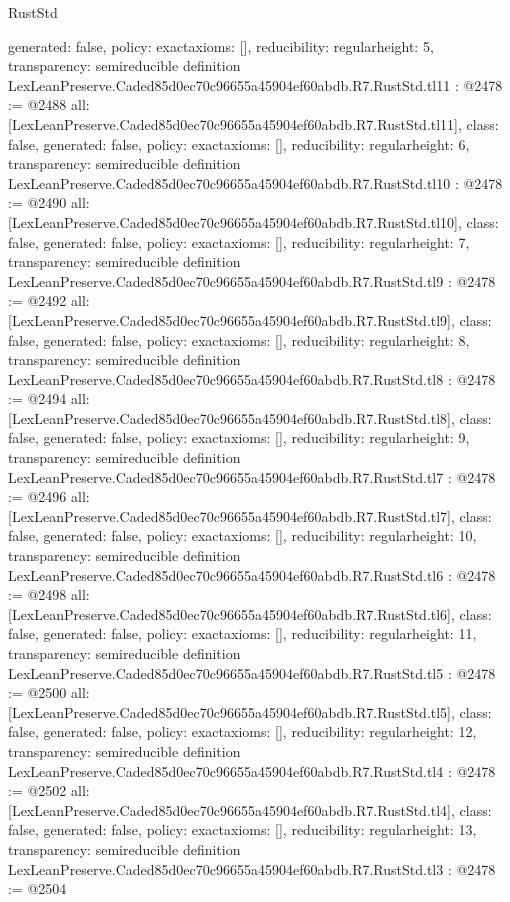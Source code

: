 \begin{lexlean}{RustStd}
\begin{coremodule}
{  generated: false,
  policy: exact{axioms: []},
  reducibility: regular{height: 5},
  transparency: semireducible
}
definition LexLeanPreserve.Caded85d0ec70c96655a45904ef60abdb.R7.RustStd.tl11 : @2478 := @2488 {
  all: [LexLeanPreserve.Caded85d0ec70c96655a45904ef60abdb.R7.RustStd.tl11],
  class: false,
  generated: false,
  policy: exact{axioms: []},
  reducibility: regular{height: 6},
  transparency: semireducible
}
definition LexLeanPreserve.Caded85d0ec70c96655a45904ef60abdb.R7.RustStd.tl10 : @2478 := @2490 {
  all: [LexLeanPreserve.Caded85d0ec70c96655a45904ef60abdb.R7.RustStd.tl10],
  class: false,
  generated: false,
  policy: exact{axioms: []},
  reducibility: regular{height: 7},
  transparency: semireducible
}
definition LexLeanPreserve.Caded85d0ec70c96655a45904ef60abdb.R7.RustStd.tl9 : @2478 := @2492 {
  all: [LexLeanPreserve.Caded85d0ec70c96655a45904ef60abdb.R7.RustStd.tl9],
  class: false,
  generated: false,
  policy: exact{axioms: []},
  reducibility: regular{height: 8},
  transparency: semireducible
}
definition LexLeanPreserve.Caded85d0ec70c96655a45904ef60abdb.R7.RustStd.tl8 : @2478 := @2494 {
  all: [LexLeanPreserve.Caded85d0ec70c96655a45904ef60abdb.R7.RustStd.tl8],
  class: false,
  generated: false,
  policy: exact{axioms: []},
  reducibility: regular{height: 9},
  transparency: semireducible
}
definition LexLeanPreserve.Caded85d0ec70c96655a45904ef60abdb.R7.RustStd.tl7 : @2478 := @2496 {
  all: [LexLeanPreserve.Caded85d0ec70c96655a45904ef60abdb.R7.RustStd.tl7],
  class: false,
  generated: false,
  policy: exact{axioms: []},
  reducibility: regular{height: 10},
  transparency: semireducible
}
definition LexLeanPreserve.Caded85d0ec70c96655a45904ef60abdb.R7.RustStd.tl6 : @2478 := @2498 {
  all: [LexLeanPreserve.Caded85d0ec70c96655a45904ef60abdb.R7.RustStd.tl6],
  class: false,
  generated: false,
  policy: exact{axioms: []},
  reducibility: regular{height: 11},
  transparency: semireducible
}
definition LexLeanPreserve.Caded85d0ec70c96655a45904ef60abdb.R7.RustStd.tl5 : @2478 := @2500 {
  all: [LexLeanPreserve.Caded85d0ec70c96655a45904ef60abdb.R7.RustStd.tl5],
  class: false,
  generated: false,
  policy: exact{axioms: []},
  reducibility: regular{height: 12},
  transparency: semireducible
}
definition LexLeanPreserve.Caded85d0ec70c96655a45904ef60abdb.R7.RustStd.tl4 : @2478 := @2502 {
  all: [LexLeanPreserve.Caded85d0ec70c96655a45904ef60abdb.R7.RustStd.tl4],
  class: false,
  generated: false,
  policy: exact{axioms: []},
  reducibility: regular{height: 13},
  transparency: semireducible
}
definition LexLeanPreserve.Caded85d0ec70c96655a45904ef60abdb.R7.RustStd.tl3 : @2478 := @2504 {
}
\end{coremodule}
\end{lexlean}
